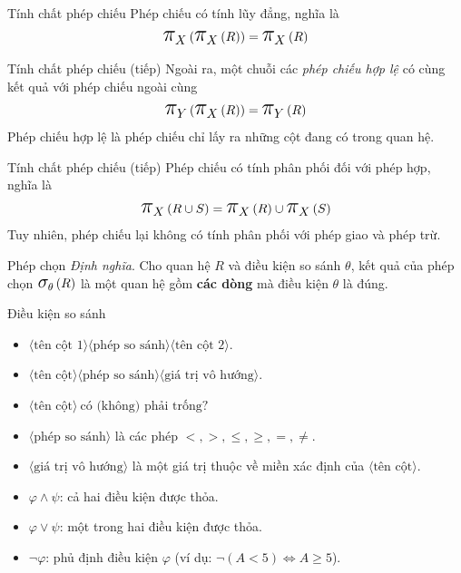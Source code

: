 \documentclass[11pt, handout]{beamer}
\newcommand{\mmm}[1]{\mathlarger{\mathlarger{\mathlarger#1}}}%
\newcommand{\ppi}[2]{\mmm{\pi}_{#1}\left(#2\right)}%
\newcommand{\psig}[2]{\mmm{\sigma}_{#1}\left(#2\right)}%
\begin{document}
  \begin{frame}{Tính chất phép chiếu}
    Phép chiếu có tính lũy đẳng, nghĩa là
    $$\ppi{X}{\ppi{X}{R}} = \ppi{X}{R}$$
  \end{frame}
  \begin{frame}{Tính chất phép chiếu (tiếp)}
    Ngoài ra, một chuỗi các \textit{phép chiếu hợp lệ} có cùng kết quả với phép chiếu ngoài cùng
    $$\ppi{Y}{\ppi{X}{R}} = \ppi{Y}{R}$$
    Phép chiếu hợp lệ là phép chiếu chỉ lấy ra những cột đang có trong quan hệ.
  \end{frame}
  \begin{frame}{Tính chất phép chiếu (tiếp)}
    Phép chiếu có tính phân phối đối với phép hợp, nghĩa là
    $$\ppi{X}{R \cup S} = \ppi{X}{R} \cup \ppi{X}{S}$$
    Tuy nhiên, phép chiếu lại không có tính phân phối với phép giao và phép trừ.
  \end{frame}
  \begin{frame}{Phép chọn}
  \textit{Định nghĩa}. Cho quan hệ $R$ và điều kiện so sánh $\theta$, kết quả của 
  phép chọn $\psig{\theta}{R}$ là một quan hệ gồm \textbf{các dòng} mà điều kiện $\theta$ là đúng.
  \end{frame}
  \begin{frame}{Điều kiện so sánh}
    \begin{itemize}
      \item<2-> $\langle\text{tên cột 1}\rangle\langle\text{phép so sánh}\rangle\langle\text{tên cột 2}\rangle$.
      \item<3-> $\langle\text{tên cột}\rangle\langle\text{phép so sánh}\rangle\langle\text{giá trị vô hướng}\rangle$.
      \item<4-> $\langle\text{tên cột}\rangle~\text{có (không) phải trống?}$
    \end{itemize}
  \end{frame}
  \begin{frame}
    \begin{itemize}
      \item<2-> $\langle\text{phép so sánh}\rangle$ là các phép $<, >, \leq, \geq, =, \neq$.
      \item<3-> $\langle\text{giá trị vô hướng}\rangle$ là một giá trị thuộc về miền xác định của $\langle\text{tên cột}\rangle$.
    \end{itemize}
  \end{frame}
  \begin{frame}
    \begin{itemize}
      \item<2-> $\varphi \wedge \psi$: cả hai điều kiện được thỏa.
      \item<3-> $\varphi \vee \psi$: một trong hai điều kiện được thỏa.
      \item<4-> $\neg \varphi$: phủ định điều kiện $\varphi$ (ví dụ: $\neg (A < 5) \Leftrightarrow A \geq 5$).
    \end{itemize}
  \end{frame}
\end{document}
